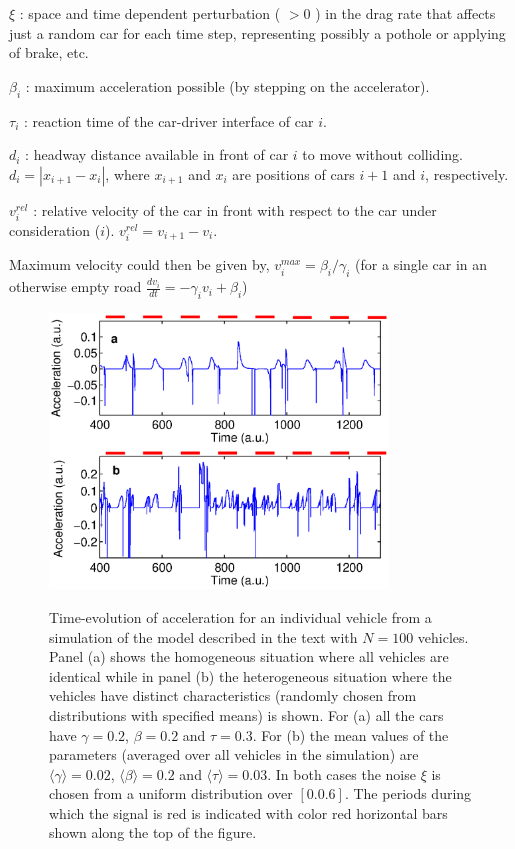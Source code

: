 \documentclass[conference]{IEEEtran}
\begin{document}
$\xi$ : space and time dependent perturbation ( $>0$ ) in the drag rate that affects just a random car for each time step, representing possibly a pothole or applying of brake, etc.

$\beta_{i}$ : maximum acceleration possible (by stepping on %
the accelerator).

$\tau_{i}$ : reaction time of the car-driver interface of car $i$.

$d_{i}$ : headway distance available in front of car $i$ to move without colliding. $d_{i}=|x_{i+1}-x_{i}|$, where $x_{i+1}$ and $x_{i}$ are positions of cars $i+1$ and $i$, respectively.

$v^{rel}_{i}$ : relative velocity of the car in front with respect to the car under consideration ($i$). $v^{rel}_{i}=v_{i+1}-v_{i}$.

Maximum velocity could then be given by, $v^{max}_{i}=\beta_{i}/\gamma_{i}$ (for a single car in an otherwise empty road $\frac{dv_{i}}{dt}=-\gamma_{i} v_{i} + \beta_{i}$)


\begin{figure}
{    \includegraphics[width=9.0cm, angle=0]{figures/fig2_v2.eps}}
\caption{Time-evolution of acceleration for an individual 
vehicle from a simulation of the model described in the text with $N =
100$ vehicles. Panel (a) shows the homogeneous
situation where all vehicles are identical while in panel (b) the 
heterogeneous situation where
the vehicles have distinct characteristics (randomly chosen from 
distributions with specified means) is shown.
For (a) all the cars have $\gamma=0.2$, $\beta=0.2$ and $\tau=0.3$.
For (b) the mean values of the parameters (averaged over all vehicles 
in the simulation) are
$\langle \gamma \rangle =0.02$, $\langle \beta \rangle =0.2$ and
$\langle \tau \rangle =0.03$. In both cases the noise $\xi$ is chosen
from a uniform distribution over $[0.0.6]$. The periods during which
the
signal is red is indicated with color red horizontal bars shown along
the top of the figure.}
    \label{acc_t}
\end{figure}
\end{document}
